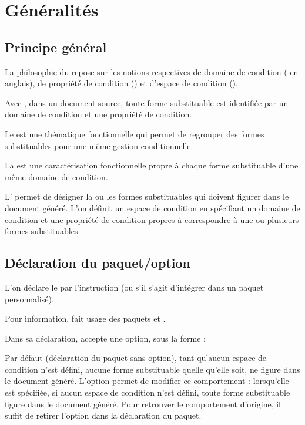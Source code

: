 \documentclass{article}
\begin{document}
\section{Généralités}
\subsection{Principe général}
La philosophie du  repose sur les notions respectives de domaine de condition ( en anglais), de propriété de condition () et d'espace de condition ().

Avec , dans un document source, toute forme substituable est identifiée par un domaine de condition et une propriété de condition.

Le  est une thématique fonctionnelle qui permet de regrouper des formes substituables pour une même gestion conditionnelle.

La  est une caractérisation fonctionnelle propre à chaque forme substituable d'une même domaine de condition.

L' permet de désigner la ou les formes substituables qui doivent figurer dans le document généré. L'on définit un espace de condition en spécifiant un domaine de condition et une propriété de condition propres à correspondre à une ou plusieurs formes substituables.

\subsection{Déclaration du paquet/option}
L'on déclare le  par l'instruction  (ou  s'il s'agit d'intégrer  dans un paquet personnalisé).

Pour information,  fait usage des paquets  et .

Dans sa déclaration,  accepte une option, sous la forme :


Par défaut (déclaration du paquet sans option), tant qu'aucun espace de condition n'est défini, aucune forme substituable quelle qu'elle soit, ne figure dans le document généré. L'option  permet de modifier ce comportement : lorsqu'elle est spécifiée, si aucun espace de condition n'est défini, toute forme substituable figure dans le document généré. Pour retrouver le comportement d'origine, il suffit de retirer l'option dans la déclaration du paquet.
\end{document}
